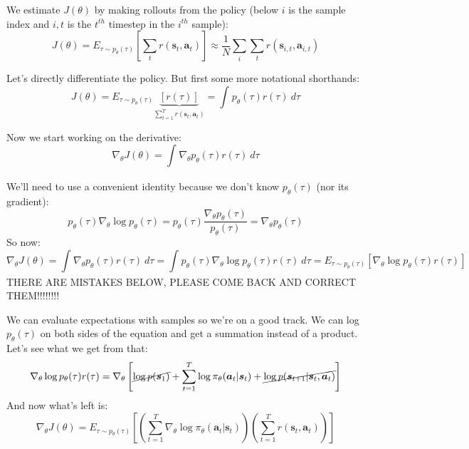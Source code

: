 \documentclass{report}
\begin{document}
We estimate $J(\theta)$ by making rollouts from the policy (below $i$ is the sample index and $i,t$ is the $t^{th}$ timestep
in the $i^{th}$ sample):
\begin{equation}
		J(\theta) = E_{\tau \sim p_\theta(\tau)} \left [ \sum_t r(\bm{s}_t, \bm{a}_t) \right ] \approx 
		\frac{1}{N} \sum_i \sum_t r(\bm{s}_{i,t}, \bm{a}_{i,t})
\end{equation}

Let's directly differentiate the policy.
But first some more notational shorthands:
\begin{equation}
		J(\theta) = E_{\tau \sim p_\theta(\tau)} \underbrace{[r(\tau)]}_{\sum^{T}_{t=1} r(\bm{s}_t, \bm{a}_t)} = 
		\int_{{}}^{} {p_\theta(\tau)r(\tau)} \: d{\tau} {}
\end{equation}

Now we start working on the derivative:
\begin{equation}
		\nabla_\theta J(\theta) = \int_{{}}^{{}} {\nabla_\theta p_\theta (\tau) r(\tau)} \: d{\tau} {}
\end{equation}

We'll need to use a convenient identity because we don't know $p_\theta(\tau)$ (nor its gradient):
\begin{equation}
	p_\theta(\tau) \nabla_\theta \log p_\theta(\tau) =
	p_\theta (\tau) \frac{\nabla_\theta p_\theta(\tau)}{p_\theta(\tau)} =
	\nabla_\theta p_\theta(\tau)
\end{equation}
So now:
\begin{equation}
		\nabla_\theta J(\theta) = \int_{{}}^{{}} {\nabla_\theta p_\theta (\tau) r(\tau)} \: d{\tau} {}
		=
		\int_{{}}^{{}} {p_\theta(\tau) \nabla_\theta \log  p_\theta(\tau) r(\tau) } \: d{\tau} =
		E_{\tau \sim p_\theta(\tau)} [\nabla_\theta \log p_\theta(\tau)r(\tau)]
\end{equation}
THERE ARE MISTAKES BELOW, PLEASE COME BACK AND CORRECT THEM!!!!!!!!

We can evaluate expectations with samples so we're on a good track.
We can log $p_\theta(\tau)$ on both sides of the equation and get a summation instead of a product.
Let's see what we get from that:
\begin{equation}
		\nabla_\theta \log p_\theta(\tau)r(\tau) =
\nabla_\theta \left [\cancel{\log p(\bm{s}_1)} + \sum^{T}_{t=1} \log \pi_\theta (\bm{a}_t | \bm{s}_t) + \cancel{\log p(\bm{s}_{t+1} | \bm{s}_t, \bm{a}_t)} \right ]
\end{equation}
And now what's left is:
\begin{equation}
		\nabla_\theta J(\theta) = E_{\tau \sim p_\theta(\tau)} 
		\left [ \left ( \sum_{t=1}^{T} \nabla_\theta \log \pi_\theta (\bm{a}_t | \bm{s}_t ) \right )
		\left ( \sum_{t=1}^{T} r(\bm{s}_t, \bm{a}_t) \right ) \right ]
\end{equation}
\end{document}
